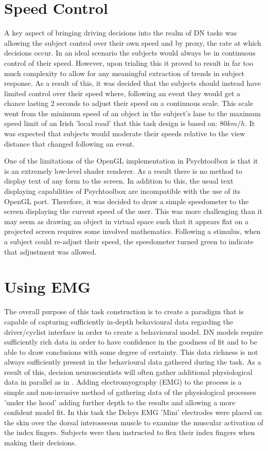 \section{Speed Control}
A key aspect of bringing driving decisions into the realm of DN tasks was allowing the subject control over their own speed and by proxy, the rate at which decisions occur. In an ideal scenario the subjects would always be in continuous control of their speed. However, upon trialing this it proved to result in far too much complexity to allow for any meaningful extraction of trends in subject response. As a result of this, it was decided that the subjects should instead have limited control over their speed where, following an event they would get a chance lasting 2 seconds to adjust their speed on a continuous scale. This scale went from the minimum speed of an object in the subject's lane to the maximum speed limit of an Irish 'local road' that this task design is based on: $80 km/h$. It was expected that subjects would moderate their speeds relative to the view distance that changed following an event.

One of the limitations of the OpenGL implementation in Psychtoolbox is that it is an extremely low-level shader renderer. As a result there is no method to display text of any form to the screen. In addition to this, the usual text displaying capabilities of Psychtoolbox are incompatible with the use of its OpenGL port. Therefore, it was decided to draw a simple speedometer to the screen displaying the current speed of the user. This was more challenging than it may seem as drawing an object in virtual space such that it appears flat on a projected screen requires some involved mathematics. Following a stimulus, when a subject could re-adjust their speed, the speedometer turned green to indicate that adjustment was allowed.

\section{Using EMG}
The overall purpose of this task construction is to create a paradigm that is capable of capturing sufficiently in-depth behavioural data regarding the driver/cyclist interface in order to create a behavioural model. DN models require sufficiently rich data in order to have confidence in the goodness of fit and to be able to draw conclusions with some degree of certainty. This data richness is not always sufficiently present in the behavioural data gathered during the task. As a result of this, decision neuroscientists will often gather additional physiological data in parallel as in \citet{dendauwGatedCascadeDiffusion2024}. Adding electromyography (EMG) to the process is a simple and non-invasive method of gathering data of the physiological processes 'under the hood' adding further depth to the results and allowing a more confident model fit.
In this task the Delsys EMG 'Mini' electrodes were placed on the skin over the dorsal interosseous muscle to examine the muscular activation of the index fingers. Subjects were then instructed to flex their index fingers when making their decisions.

